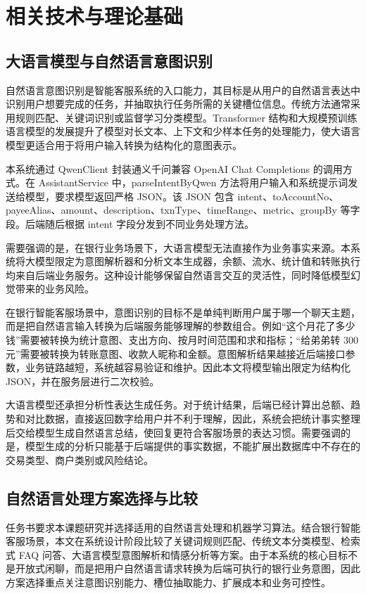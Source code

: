 \documentclass[bachelor, print]{xduthesis}
\begin{document}
\chapter{相关技术与理论基础}

\section{大语言模型与自然语言意图识别}

自然语言意图识别是智能客服系统的入口能力，其目标是从用户的自然语言表达中识别用户想要完成的任务，并抽取执行任务所需的关键槽位信息。传统方法通常采用规则匹配、关键词识别或监督学习分类模型。Transformer 结构和大规模预训练语言模型的发展提升了模型对长文本、上下文和少样本任务的处理能力\cite{vaswani2017attention,brown2020language}，使大语言模型更适合用于将用户输入转换为结构化的意图表示。

本系统通过 QwenClient 封装通义千问兼容 OpenAI Chat Completions 的调用方式\cite{dashscope}。在 AssistantService 中，parseIntentByQwen 方法将用户输入和系统提示词发送给模型，要求模型返回严格 JSON。该 JSON 包含 intent、toAccountNo、payeeAlias、amount、description、txnType、timeRange、metric、groupBy 等字段。后端随后根据 intent 字段分发到不同业务处理方法。

需要强调的是，在银行业务场景下，大语言模型无法直接作为业务事实来源。本系统将大模型限定为意图解析器和分析文本生成器，余额、流水、统计值和转账执行均来自后端业务服务。这种设计能够保留自然语言交互的灵活性，同时降低模型幻觉带来的业务风险。

在银行智能客服场景中，意图识别的目标不是单纯判断用户属于哪一个聊天主题，而是把自然语言输入转换为后端服务能够理解的参数组合。例如“这个月花了多少钱”需要被转换为统计意图、支出方向、按月时间范围和求和指标；“给弟弟转 300 元”需要被转换为转账意图、收款人昵称和金额。意图解析结果越接近后端接口参数，业务链路越短，系统越容易验证和维护。因此本文将模型输出限定为结构化 JSON，并在服务层进行二次校验。

大语言模型还承担分析性表达生成任务。对于统计结果，后端已经计算出总额、趋势和对比数据，直接返回数字给用户并不利于理解，因此，系统会把统计事实整理后交给模型生成自然语言总结，使回复更符合客服场景的表达习惯。需要强调的是，模型生成的分析只能基于后端提供的事实数据，不能扩展出数据库中不存在的交易类型、商户类别或风险结论。

\section{自然语言处理方案选择与比较}

任务书要求本课题研究并选择适用的自然语言处理和机器学习算法。结合银行智能客服场景，本文在系统设计阶段比较了关键词规则匹配、传统文本分类模型、检索式 FAQ 问答、大语言模型意图解析和情感分析等方案。由于本系统的核心目标不是开放式闲聊，而是把用户自然语言请求转换为后端可执行的银行业务意图，因此方案选择重点关注意图识别能力、槽位抽取能力、扩展成本和业务可控性。
\end{document}
